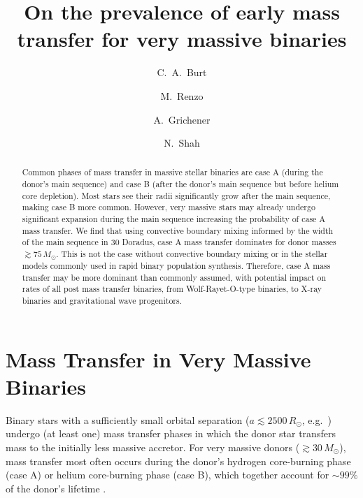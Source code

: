 \documentclass[twocolumn]{aastex63}
\begin{document}
\title{On the prevalence of early mass transfer for very massive binaries}

\author[0009-0008-2061-4946]{C.~A.~Burt}

\author[0000-0002-6718-9472]{M.~Renzo}

\author[0000-0002-2215-1841]{A.~Grichener}

\author[0000-0002-8465-8090]{N.~Shah}




\begin{abstract}
  Common phases of mass transfer in massive stellar binaries are case
  A (during the donor's main sequence) and case B (after the donor's
  main sequence but before helium core depletion). Most stars see
  their radii significantly grow after the main sequence, making case
  B more common. However, very massive stars may already undergo
  significant expansion during the main sequence increasing the
  probability of case A mass transfer. We find that using convective
  boundary mixing informed by the width of the main sequence in 30
  Doradus, case A mass transfer dominates for donor masses
  $\gtrsim 75 \, M_{\odot}$. This is not the case without convective
  boundary mixing or in the stellar models commonly used in rapid
  binary population synthesis.  Therefore, case A mass transfer may be
  more dominant than commonly assumed, with potential impact on rates
  of all post mass transfer binaries, from Wolf-Rayet-O-type binaries,
  to X-ray binaries and gravitational wave progenitors.
\end{abstract}

\section{Mass Transfer in Very Massive Binaries}

Binary stars with a sufficiently small orbital separation
($a\lesssim2500\,R_{\odot}$, e.g.~\citealt{sana:12}) undergo (at least
one) mass transfer phases in which the donor star transfers mass to
the initially less massive accretor. For very massive donors
($ \gtrsim 30 \, M_{\odot}$), mass transfer most often occurs during
the donor's hydrogen core-burning phase (case A) or helium
core-burning phase (case B), which together account for $\sim99\%$ of
the donor's lifetime \citep{kippenhahn:67}.
\end{document}
